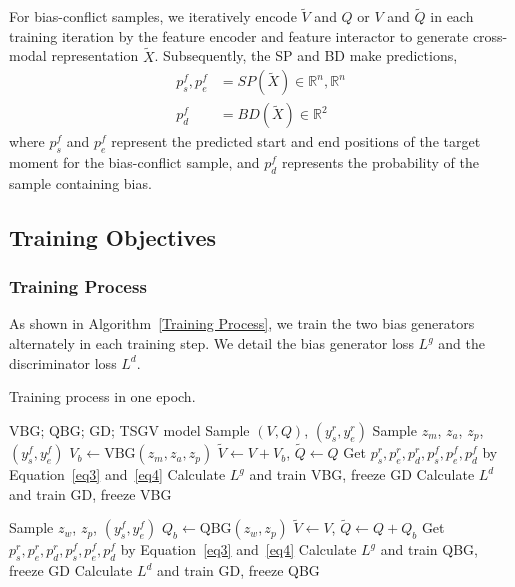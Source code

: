 For bias-conflict samples, we iteratively encode $\tilde{V}$ and $Q$ or $V$ and $\tilde{Q}$ in each training iteration by the feature encoder and feature interactor to generate cross-modal representation $\tilde{X}$. Subsequently, the SP and BD make predictions,
\begin{equation}
	\begin{split}
		p_{s}^f, p_{e}^f &= SP(\tilde{X}) \in \mathbb{R}^{n}, \mathbb{R}^{n}\\
		p_{d}^f &= BD(\tilde{X}) \in \mathbb{R}^{2}
	\end{split}
	\label{eq4}
\end{equation}
where $p_{s}^f$ and $p_{e}^f$ represent the predicted start and end positions of the target moment for the bias-conflict sample, and $p_{d}^f$ represents the probability of the sample containing bias.


\subsection{Training Objectives}

\subsubsection{Training Process}

As shown in Algorithm~\ref{Training Process}, we train the two bias generators alternately in each training step. We detail the bias generator loss $L^g$ and the discriminator loss $L^d$.


\begin{algorithm}[t]
	\caption{Training process in one epoch.}
	\label{Training Process}
	\begin{algorithmic}[1] %
		\REQUIRE $\text{VBG}$; $\text{QBG}$; $\text{GD}$;
		\ENSURE TSGV model
		\STATE Sample $\left(V, Q \right)$, $(y_s^r,y_e^r)$
		\STATE Sample $z_m$, $z_a$, $z_p$, $(y_s^f,y_e^f)$
		\STATE $V_b \leftarrow \text{VBG}(z_m, z_a, z_p)$
		\STATE $\tilde{V} \leftarrow V + V_b$, $\tilde{Q} \leftarrow Q$
		\STATE Get $p_{s}^r, p_{e}^r, p_{d}^r, p_{s}^f, p_{e}^f, p_{d}^f$ by Equation~\ref{eq3} and~\ref{eq4} 
		\STATE Calculate $L^g$ and train VBG, freeze GD
		\STATE Calculate $L^d$ and train GD, freeze VBG
		
		\STATE Sample $z_w$, $z_p$, $(y_s^f,y_e^f)$
		\STATE $Q_b \leftarrow \text{QBG}(z_w, z_p)$
		\STATE $\tilde{V} \leftarrow V$, $\tilde{Q} \leftarrow Q + Q_b$
		\STATE Get $p_{s}^r, p_{e}^r, p_{d}^r, p_{s}^f, p_{e}^f, p_{d}^f$ by Equation~\ref{eq3} and~\ref{eq4} 
		\STATE Calculate $L^g$ and train QBG, freeze GD
		\STATE Calculate $L^d$ and train GD, freeze QBG
		\ENDFOR
	\end{algorithmic}
\end{algorithm}


